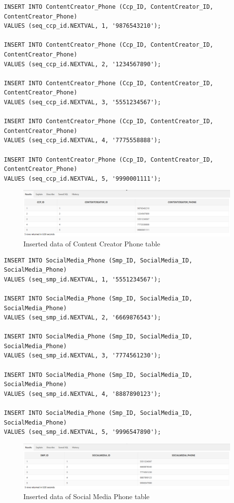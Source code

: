 \begin{lstlisting}[caption={Inserting data into ContentCreator\_Phone tables},label={lst:insert_ContentCreator_Phone}]
INSERT INTO ContentCreator_Phone (Ccp_ID, ContentCreator_ID, ContentCreator_Phone)
VALUES (seq_ccp_id.NEXTVAL, 1, '9876543210');

INSERT INTO ContentCreator_Phone (Ccp_ID, ContentCreator_ID, ContentCreator_Phone)
VALUES (seq_ccp_id.NEXTVAL, 2, '1234567890');

INSERT INTO ContentCreator_Phone (Ccp_ID, ContentCreator_ID, ContentCreator_Phone)
VALUES (seq_ccp_id.NEXTVAL, 3, '5551234567');

INSERT INTO ContentCreator_Phone (Ccp_ID, ContentCreator_ID, ContentCreator_Phone)
VALUES (seq_ccp_id.NEXTVAL, 4, '7775558888');

INSERT INTO ContentCreator_Phone (Ccp_ID, ContentCreator_ID, ContentCreator_Phone)
VALUES (seq_ccp_id.NEXTVAL, 5, '9990001111');
\end{lstlisting}
\begin{figure}[H]
    \centering
    \includegraphics[width=1\textwidth]{images/TableData/CONTENTCREATOR_PHONE.png}
    \caption{Inserted data of Content Creator Phone table}
\end{figure}


\begin{lstlisting}[caption={Inserting data into SocialMedia\_Phone tables},label={lst:insert_SocialMedia_Phone}]
INSERT INTO SocialMedia_Phone (Smp_ID, SocialMedia_ID, SocialMedia_Phone)
VALUES (seq_smp_id.NEXTVAL, 1, '5551234567');

INSERT INTO SocialMedia_Phone (Smp_ID, SocialMedia_ID, SocialMedia_Phone)
VALUES (seq_smp_id.NEXTVAL, 2, '6669876543');

INSERT INTO SocialMedia_Phone (Smp_ID, SocialMedia_ID, SocialMedia_Phone)
VALUES (seq_smp_id.NEXTVAL, 3, '7774561230');

INSERT INTO SocialMedia_Phone (Smp_ID, SocialMedia_ID, SocialMedia_Phone)
VALUES (seq_smp_id.NEXTVAL, 4, '8887890123');

INSERT INTO SocialMedia_Phone (Smp_ID, SocialMedia_ID, SocialMedia_Phone)
VALUES (seq_smp_id.NEXTVAL, 5, '9996547890');
\end{lstlisting}
\begin{figure}[H]
    \centering
    \includegraphics[width=1\textwidth]{images/TableData/SOCIALMEDIA_PHONE.png}
    \caption{Inserted data of Social Media Phone table}
\end{figure}


